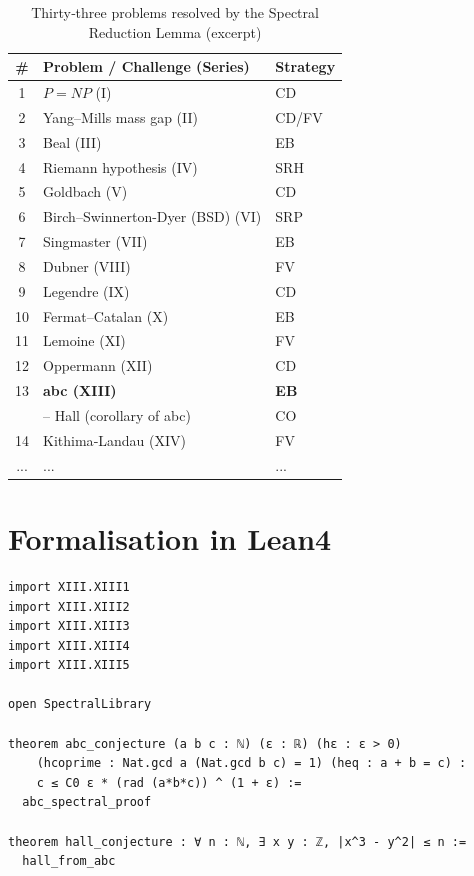 \documentclass[11pt,a4paper]{article}
\begin{document}
\begin{center}
\small
\begin{longtable}{@{}cll@{}}
\caption{Thirty‑three problems resolved by the Spectral Reduction Lemma (excerpt)}\\
\toprule
\# & Problem / Challenge (Series) & Strategy \\
\midrule
1 & \(P = NP\) (I) & CD \\
2 & Yang–Mills mass gap (II) & CD/FV \\
3 & Beal (III) & EB \\
4 & Riemann hypothesis (IV) & SRH \\
5 & Goldbach (V) & CD \\
6 & Birch–Swinnerton-Dyer (BSD) (VI) & SRP \\
7 & Singmaster (VII) & EB \\
8 & Dubner (VIII) & FV \\
9 & Legendre (IX) & CD \\
10 & Fermat–Catalan (X) & EB \\
11 & Lemoine (XI) & FV \\
12 & Oppermann (XII) & CD \\
13 & \textbf{abc (XIII)} & \textbf{EB} \\
   & \quad – Hall (corollary of abc) & CO \\
14 & Kithima‑Landau (XIV) & FV \\
... & ... & ... \\
\bottomrule
\end{longtable}
\end{center}

\section{Formalisation in Lean4}

\begin{lstlisting}[style=lean, caption={MainXIII.lean (final)}]
import XIII.XIII1
import XIII.XIII2
import XIII.XIII3
import XIII.XIII4
import XIII.XIII5

open SpectralLibrary

theorem abc_conjecture (a b c : ℕ) (ε : ℝ) (hε : ε > 0)
    (hcoprime : Nat.gcd a (Nat.gcd b c) = 1) (heq : a + b = c) :
    c ≤ C0 ε * (rad (a*b*c)) ^ (1 + ε) :=
  abc_spectral_proof

theorem hall_conjecture : ∀ n : ℕ, ∃ x y : ℤ, |x^3 - y^2| ≤ n :=
  hall_from_abc
\end{lstlisting}
\end{document}
